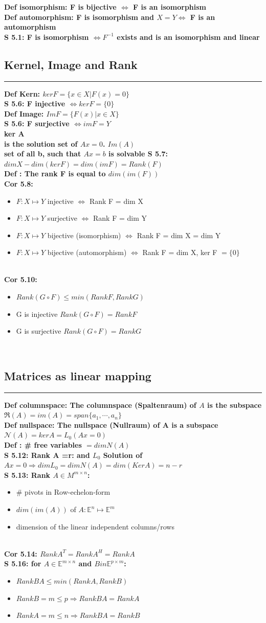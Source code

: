 \documentclass[7pt,landscape, margin = 0.1mm]{article}
\newcommand*{\mysubsection}[1]{\vspace{-2mm}\color{chaptercolor}\subsection{ #1 }
\vspace{-1mm}\hrule\vspace{1.5mm}\color{black}
\vspace{2mm}}
\newcommand{\COL}[1]{ \color{chaptercolor} \bf{#1}\color{black}     \\}
\newcommand{\DEF}[2]{\color{chaptercolor}\bf{Def #1}:\color{black}    \hspace{0.2cm} #2 \\}
\newcommand{\COR}[2]{\color{chaptercolor}\bf{Cor #1}:\color{black}    \hspace{0.2cm} #2 \\}
\newcommand{\SA}[2]{\color{chaptercolor}\bf{S #1}:\color{black}    \hspace{0.2cm} #2 \\}
\begin{document}
\begin{multicols}{4}
\begin{flushleft}
\DEF{isomorphism}{F is bijective $\Leftrightarrow $ F is an isomorphism}
\DEF{automorphism}{F is isomorphism and $X = Y\Leftrightarrow $ F is an automorphism}
\SA{5.1}{F is isomorphism $\Leftrightarrow F^{-1}$ exists and is an isomorphism and linear}
\mysubsection{\centering Kernel, Image and Rank}

\DEF{Kern}{ $ ker F = \{ x \in X | F(x)=0 \}$}
\SA{5.6}{F injective $\Leftrightarrow ker F = \{0\} $}
\DEF{Image}{ $ Im F = \{ F(x) | x \in X \}$}
\SA{5.6}{F surjective $\Leftrightarrow im F = Y $}
\COL{ker A} is the solution set of $Ax=0$. \COL{$Im (A)$} set of all b, such that $Ax=b$ is solvable
\SA{5.7}{$dim X - dim (ker F) = dim (im F) = Rank(F) $}
\DEF{}{The rank F is equal to $dim(im (F))$}
\COR{5.8}{
\begin{itemize}
\item $F: X \mapsto Y $ injective $\Leftrightarrow $ Rank F = dim X
\item $F: X \mapsto Y $ surjective $\Leftrightarrow $ Rank F = dim Y
\item $F: X \mapsto Y $ bijective (isomorphism) $\Leftrightarrow $ Rank F = dim X = dim Y

\item $F: X \mapsto Y $ bijective (automorphism) $\Leftrightarrow $ Rank F = dim X, ker F $= \{0\}$
\end{itemize}

}
\COR{5.10}{\begin{itemize}
\item $Rank (G \circ F) \leq min(Rank F, Rank G)$
\item G is injective $Rank (G \circ F) = Rank F $
\item G is surjective $Rank (G \circ F) = Rank G $
\end{itemize}}
\mysubsection{\centering Matrices as linear mapping}
\DEF{columnspace}{ The columnspace (Spaltenraum) of $A$ is the subspace $\Re(A)= im(A)= span \{ a_1 , \cdots , a_n \} $}

\DEF{nullspace}{The nullspace (Nullraum) of A is a subspace $ \mathcal{N}(A) = ker A = L_0(Ax=0)$}

\DEF{}{\# free variables $=dim N(A) $}
\SA{5.12}{Rank A =r: and $L_0$ Solution of $Ax=0 \Rightarrow dim L_0 = dim N(A) = dim(Ker A)= n-r$}
\SA{5.13}{Rank $A \in M^{m \times n}$: 
\begin{itemize}
\item # pivots in Row-echelon-form
\item $dim(im (A))$ of $A: \mathbb{E}^n \mapsto \mathbb{E}^m $
\item dimension of the linear independent columns/rows
\end{itemize}}
\COR{5.14}{$Rank A^T= Rank A^H = Rank A$}
\SA{5.16}{for $A \in \mathbb{E}^{m \times n} $ and $B in  \mathbb{E}^{p \times m} $:
\begin{itemize}
\item $Rank BA \leq min (Rank A,Rank B)$
\item $Rank B  = m \leq p \Rightarrow Rank BA = Rank A$
\item $Rank A = m \leq n \Rightarrow Rank BA = Rank B$
\end{itemize}

}
\end{flushleft}
\end{multicols}
\end{document}
